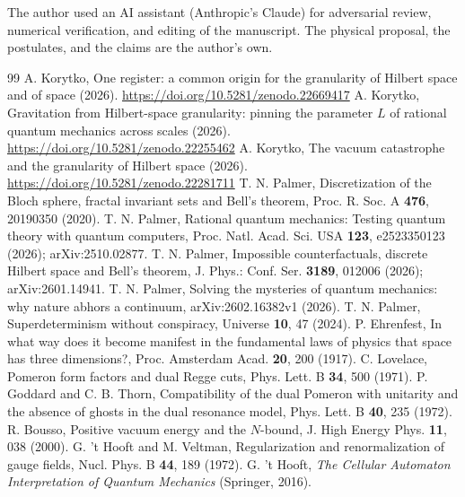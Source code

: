 \documentclass[aps,prd,twocolumn,superscriptaddress,nofootinbib]{revtex4-2}
\begin{document}
\begin{acknowledgments}
The author used an AI assistant (Anthropic's Claude) for adversarial review, numerical verification, and editing of the manuscript. The physical proposal, the postulates, and the claims are the author's own.
\end{acknowledgments}

\begin{thebibliography}{99}
 A. Korytko, One register: a common origin for the granularity of Hilbert space and of space (2026). \mbox{\url{https://doi.org/10.5281/zenodo.22669417}}
 A. Korytko, Gravitation from Hilbert-space granularity: pinning the parameter $L$ of rational quantum mechanics across scales (2026). \mbox{\url{https://doi.org/10.5281/zenodo.22255462}}
 A. Korytko, The vacuum catastrophe and the granularity of Hilbert space (2026). \mbox{\url{https://doi.org/10.5281/zenodo.22281711}}
 T. N. Palmer, Discretization of the Bloch sphere, fractal invariant sets and Bell's theorem, Proc. R. Soc. A \textbf{476}, 20190350 (2020).
 T. N. Palmer, Rational quantum mechanics: Testing quantum theory with quantum computers, Proc. Natl. Acad. Sci. USA \textbf{123}, e2523350123 (2026); arXiv:2510.02877.
 T. N. Palmer, Impossible counterfactuals, discrete Hilbert space and Bell's theorem, J. Phys.: Conf. Ser. \textbf{3189}, 012006 (2026); arXiv:2601.14941.
 T. N. Palmer, Solving the mysteries of quantum mechanics: why nature abhors a continuum, arXiv:2602.16382v1 (2026).
 T. N. Palmer, Superdeterminism without conspiracy, Universe \textbf{10}, 47 (2024).
 P. Ehrenfest, In what way does it become manifest in the fundamental laws of physics that space has three dimensions?, Proc. Amsterdam Acad. \textbf{20}, 200 (1917).
 C. Lovelace, Pomeron form factors and dual Regge cuts, Phys. Lett. B \textbf{34}, 500 (1971).
 P. Goddard and C. B. Thorn, Compatibility of the dual Pomeron with unitarity and the absence of ghosts in the dual resonance model, Phys. Lett. B \textbf{40}, 235 (1972).
 R. Bousso, Positive vacuum energy and the $N$-bound, J. High Energy Phys. \textbf{11}, 038 (2000).
 G. 't Hooft and M. Veltman, Regularization and renormalization of gauge fields, Nucl. Phys. B \textbf{44}, 189 (1972).
 G. 't Hooft, \emph{The Cellular Automaton Interpretation of Quantum Mechanics} (Springer, 2016).

\end{thebibliography}
\end{document}
